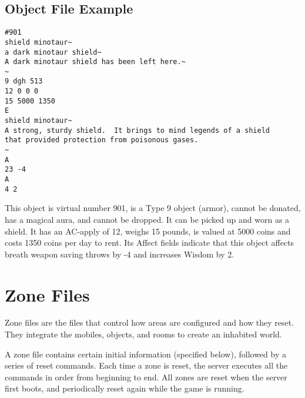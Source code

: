\documentclass[11pt]{article}
\begin{document}
\subsection{Object File Example}
\begin{verbatim}
#901
shield minotaur~
a dark minotaur shield~
A dark minotaur shield has been left here.~
~
9 dgh 513
12 0 0 0
15 5000 1350
E
shield minotaur~
A strong, sturdy shield.  It brings to mind legends of a shield
that provided protection from poisonous gases.
~
A
23 -4
A
4 2
\end{verbatim}
This object is virtual number 901, is a Type 9 object (armor), cannot be donated, has a magical aura, and cannot be dropped.  It can be picked up and worn as a shield.  It has an AC-apply of 12, weighs 15 pounds, is valued at 5000 coins and costs 1350 coins per day to rent.  Its Affect fields indicate that this object affects breath weapon saving throws by -4 and increases Wisdom by 2.

\section{Zone Files}
Zone files are the files that control how areas are configured and how they reset.  They integrate the mobiles, objects, and rooms to create an inhabited world.
\par
A zone file contains certain initial information (specified below), followed by a series of reset commands.  Each time a zone is reset, the server executes all the commands in order from beginning to end.  All zones are reset when the server first boots, and periodically reset again while the game is running.
\end{document}

